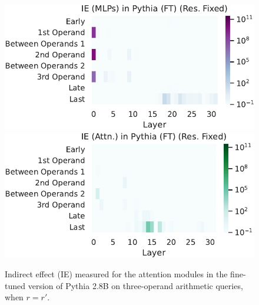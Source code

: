 \documentclass[11pt]{article}
\begin{document}
\begin{figure}[t]
    \centering
    \includegraphics[width=\columnwidth]{img/pythia/3ops/pythia-ft-3ops-mlp-int2.pdf}
    \includegraphics[width=\columnwidth]{img/pythia/3ops/pythia-ft-3ops-attn-int2.pdf}
    \caption{Indirect effect (IE) measured for the attention modules in the fine-tuned version of Pythia 2.8B on three-operand arithmetic queries, when $r=r'$.}
    \label{fig:pythia-ft-3ops-int2}
\end{figure}
\end{document}
